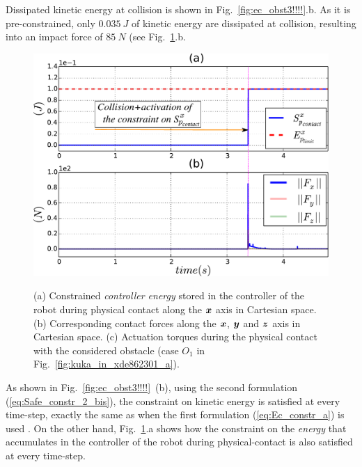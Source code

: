 \documentclass[letterpaper, 10 pt, conference]{ieeeconf}      %
\newcommand{\vect}[1]{\mbox{\boldmath${#1}$}}%
\begin{document}
Dissipated kinetic energy at collision is shown in Fig.~\ref{fig:ec_obst3!!!!}.b. As it is  pre-constrained, only $0.035~J$ of kinetic energy are dissipated at collision, resulting into an impact force of $85~N$ (see Fig.~\ref{fig:ep__f_tau65_!!!!}.b.
\begin{figure}[!htbp]
\centering
{\includegraphics[width=0.95\columnwidth]{figures/ep__f_tau65_!!!!}}
\caption{(a) Constrained \textit{controller energy} stored in the controller of the robot during physical contact along the $\vect{x}$ axis in Cartesian space. (b) Corresponding contact forces along the $\vect{x}$, $\vect{y}$ and $\vect{z}$ axis in Cartesian space. (c) Actuation torques during the physical contact with the considered obstacle (case $O_1$ in Fig.~\ref{fig:kuka_in_xde862301_a}).} 
\label{fig:ep__f_tau65_!!!!}
\end{figure}
As shown in Fig.~\ref{fig:ec_obst3!!!!}~(b), using the second formulation (\ref{eq:Safe_constr_2_bis}), the constraint on kinetic energy is satisfied at every time-step, exactly the same as when the first formulation (\ref{eq:Ec_constr_a}) is used \cite{meguenani2015control}. On the other hand, Fig.~\ref{fig:ep__f_tau65_!!!!}.a shows how the constraint on the \textit{energy} that accumulates in the controller of the robot during physical-contact is also satisfied at every time-step.
\end{document}
